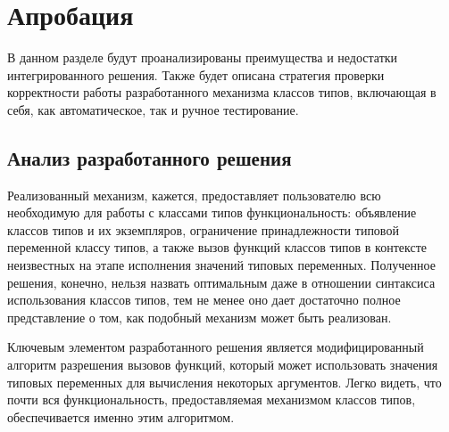 \chapter{Апробация}

В данном разделе будут проанализированы преимущества и недостатки интегрированного решения. Также будет описана стратегия проверки корректности работы разработанного механизма классов типов, включающая в себя, как автоматическое, так и ручное тестирование.  

\section{Анализ разработанного решения}

Реализованный механизм, кажется, предоставляет пользователю всю необходимую для работы с классами типов функциональность: объявление классов типов и их экземпляров, ограничение принадлежности типовой переменной классу типов, а также вызов функций классов типов в контексте неизвестных на этапе исполнения значений типовых переменных. Полученное решения, конечно, нельзя назвать оптимальным даже в отношении синтаксиса использования классов типов, тем не менее оно дает достаточно полное представление о том, как подобный механизм может быть реализован. 

Ключевым элементом разработанного решения является модифицированный алгоритм разрешения вызовов функций, который может использовать значения типовых переменных для вычисления некоторых аргументов. Легко видеть, что почти вся функциональность, предоставляемая механизмом классов типов, обеспечивается именно этим алгоритмом. 

